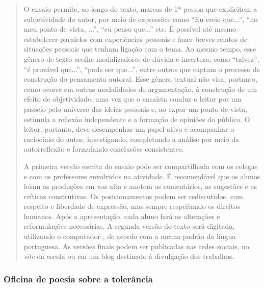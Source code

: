 \documentclass[11pt]{extarticle}
\begin{document}
\begin{quote}
O ensaio permite, ao longo do texto, marcas de 1ª pessoa que explicitem
a subjetividade do autor, por meio de expressões como ``Eu creio
que...'', ``no meu ponto de vista, ...'', ``eu penso que...'' etc. É
possível até mesmo estabelecer paralelos com experiências pessoais e
fazer breves relatos de situações pessoais que tenham ligação com o
tema. Ao mesmo tempo, esse gênero de texto acolhe modalizadores de
dúvida e incerteza, como ``talvez'', ``é provável que...'', ``pode ser
que...'', entre outros que captam o processo de construção do pensamento
autoral. Esse gênero textual não visa, portanto, como ocorre em outras
modalidades de argumentação, à construção de um efeito de objetividade,
uma vez que o ensaísta conduz o leitor por um passeio pelo universo das
ideias pessoais e, ao expor um ponto de vista, estimula a reflexão
independente e a formação de opiniões do público. O leitor, portanto,
deve desempenhar um papel ativo e acompanhar o raciocínio do autor,
investigando, completando a análise por meio da autorreflexão e
formulando conclusões consistentes.

A primeira versão escrita do ensaio pode ser compartilhada com os
colegas e com os professores envolvidos na atividade. É recomendável que
os alunos leiam as produções em voz alta e anotem os comentários, as
sugestões e as críticas construtivas. Os posicionamentos podem ser
rediscutidos, com respeito e liberdade de expressão, mas sempre
respeitando os direitos humanos. Após a apresentação, cada aluno fará as
alterações e reformulações necessárias. A segunda versão do texto será
digitada, utilizando o computador , de acordo com a norma padrão da
língua portuguesa. As versões finais podem ser publicadas nas redes
sociais, no \emph{site} da escola ou em um blog destinado à divulgação
dos trabalhos.
\end{quote}

\subsubsection{Oficina de poesia sobre a tolerância}
\end{document}
